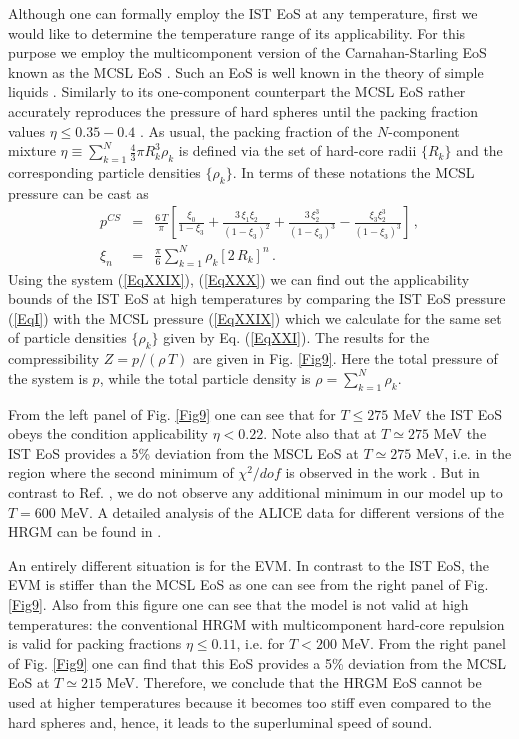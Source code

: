 \documentclass[12pt]{article}
\begin{document}
 Although one can formally employ the IST EoS at any temperature, first we would like to determine the temperature range of its applicability. For this purpose
 we employ the multicomponent version  of the Carnahan-Starling EoS known as  the MCSL EoS \cite{CSmultic}.
 Such an EoS is   well known  in the theory of simple liquids \cite{SimpleLiquids1,SimpleLiquids2}.
 Similarly to its one-component counterpart  \cite{CSeos} the MCSL EoS rather accurately reproduces the pressure of hard spheres  until the packing fraction values  $\eta \le 0.35-0.4$ \cite{CSmultic,SimpleLiquids2}. As usual,  the packing fraction of the $N$-component mixture  $\eta \equiv  \sum\limits_{k=1}^N \frac{4}{3} \pi R_k^3 \rho_k$ is defined
 via the set of  hard-core radii $\{ R_k\}$ and the corresponding particle densities $\{ \rho_k\}$.  In terms of these notations  the MCSL  pressure  
 \cite{CSmultic} can be cast  as 
 \begin{eqnarray}\label{EqXXIX}
p^{CS} &=&  \frac{6\, T}{\pi} \left[  \frac{\xi_0}{1-\xi_3}  + \frac{3\, \xi_1 \xi_2}{(1-\xi_3)^2} + 
\frac{3\,  \xi_2^3}{(1-\xi_3)^3}  -  \frac{ \xi_3  \xi_2^3}{(1-\xi_3)^3} \right] \,,\\
%
\label{EqXXX}
\xi_n  &=&   \frac{\pi}{6}  \sum\limits_{k=1}^N \rho_k \left[ 2\, R_k \right]^n \,.
\end{eqnarray}
%
Using the system (\ref{EqXXIX}), (\ref{EqXXX}) we can find out the applicability bounds of  the IST EoS at high temperatures
by comparing the IST EoS  pressure (\ref{EqI}) with the MCSL pressure (\ref{EqXXIX}) which we calculate  for the  same 
set of particle densities  $\{\rho_k\}$ given by Eq. (\ref{EqXXI}). The results for the compressibility $Z = p/(\rho\, T)$ are given in Fig. \ref{Fig9}. Here  the total  pressure of the system is $p$, while the total particle density is $\rho =  \sum\limits_{k=1}^N \rho_k$.  


From the left panel of  Fig. \ref{Fig9} one can see that  for $T \le  275$ MeV the IST EoS   obeys the condition applicability $\eta < 0.22$. Note also that at  $T \simeq 275$ MeV  the IST EoS
provides a 5\% deviation from the MSCL EoS at $T \simeq 275$ MeV, i.e. in the region where the second minimum of $\chi^2/dof$ is observed in the work   \cite{Vovch15}. 
But in contrast to Ref.  \cite{Vovch15},   we do not observe 
any additional minimum in our model up to $T = 600$ MeV.  A detailed analysis of  the ALICE data for different versions of the HRGM can be found in  \cite{Bugaev:2016}.


An entirely  different situation is for  the EVM. 
 In contrast to the IST EoS,  the EVM is stiffer than the MCSL EoS as one can see from the right panel of  Fig. \ref{Fig9}.
Also from this figure  one can see that the model  is not valid at high temperatures: 
the conventional  HRGM with multicomponent hard-core repulsion  is valid for packing fractions  $\eta \le 0.11$, i.e. for  $T < 200$ MeV.
From the right panel of  Fig. \ref{Fig9} one can find that this EoS 
provides a 5\% deviation from the MCSL EoS at  $T \simeq 215$ MeV. Therefore, we conclude that the HRGM  EoS
cannot be used  at higher temperatures  because  it  becomes  too stiff  even compared to the hard spheres  and, hence, it leads to the superluminal speed of sound. 
\end{document}
